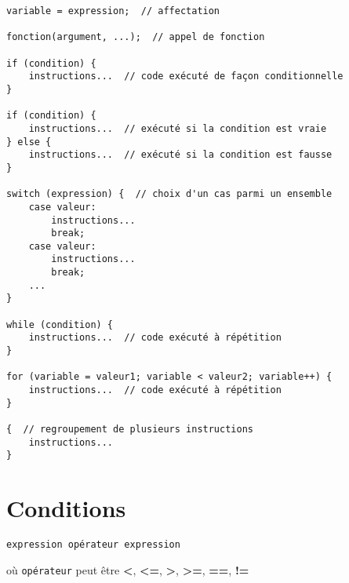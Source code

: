 \documentclass{article}
\begin{document}
\begin{verbatim}
variable = expression;  // affectation

fonction(argument, ...);  // appel de fonction

if (condition) {
    instructions...  // code exécuté de façon conditionnelle
}

if (condition) {
    instructions...  // exécuté si la condition est vraie
} else {
    instructions...  // exécuté si la condition est fausse
}

switch (expression) {  // choix d'un cas parmi un ensemble
    case valeur:
        instructions...
        break;
    case valeur:
        instructions...
        break;
    ...
}

while (condition) {
    instructions...  // code exécuté à répétition
}

for (variable = valeur1; variable < valeur2; variable++) {
    instructions...  // code exécuté à répétition
}

{  // regroupement de plusieurs instructions
    instructions...
}
\end{verbatim}

\section*{Conditions}

\begin{verbatim}
expression opérateur expression
\end{verbatim}
où \texttt{opérateur} peut être \textbf{<}, \textbf{<=}, \textbf{>},
\textbf{>=}, \textbf{==}, \textbf{!=}
\end{document}
